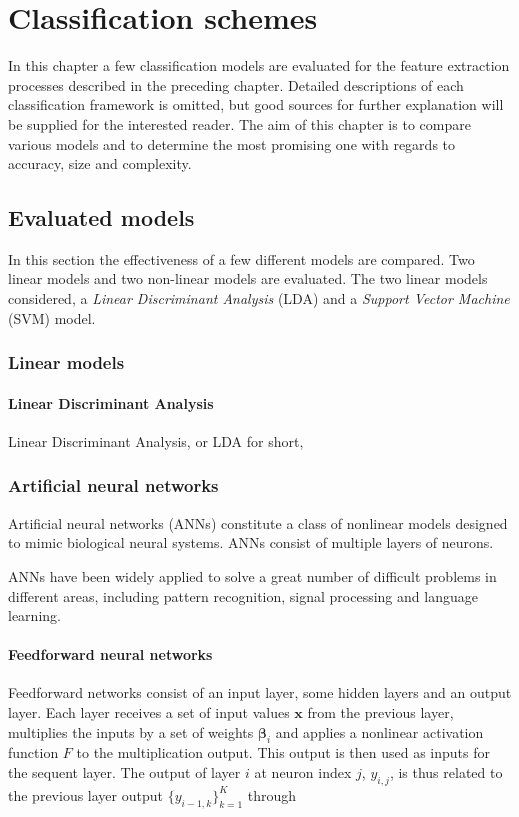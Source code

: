 \chapter{Classification schemes}

In this chapter a few classification models are evaluated for the feature extraction processes described in the preceding chapter. Detailed descriptions of each classification framework is omitted, but good sources for further explanation will be supplied for the interested reader. The aim of this chapter is to compare various models and to determine the most promising one with regards to accuracy, size and complexity. 

\section{Evaluated models}

In this section the effectiveness of a few different models are compared. Two linear models and two non-linear models are evaluated. The two linear models considered, a \emph{Linear Discriminant Analysis} (LDA) and a \emph{Support Vector Machine} (SVM) model.

\subsection{Linear models}

\subsubsection{Linear Discriminant Analysis}

Linear Discriminant Analysis, or LDA for short, 



\subsection{Artificial neural networks}

Artificial neural networks (ANNs) constitute a class of nonlinear models designed to mimic biological neural systems. ANNs consist of multiple layers of neurons. 


ANNs have been widely applied to solve a great number of difficult problems in different areas, including pattern recognition, signal processing and language learning. 


\subsubsection{Feedforward neural networks}
Feedforward networks consist of an input layer, some hidden layers and an output layer. Each layer receives a set of input values $\mathbf{x}$ from the previous layer, multiplies the inputs by a set of weights $\mathbf{\beta}_{i}$ and applies a nonlinear activation function $F$ to the multiplication output. This output is then used as inputs for the sequent layer. The output of layer $i$ at neuron index $j$, $y_{i,j}$, is thus related to the previous layer output $\{{y}_{i-1, k}\}_{k=1}^{K}$ through

